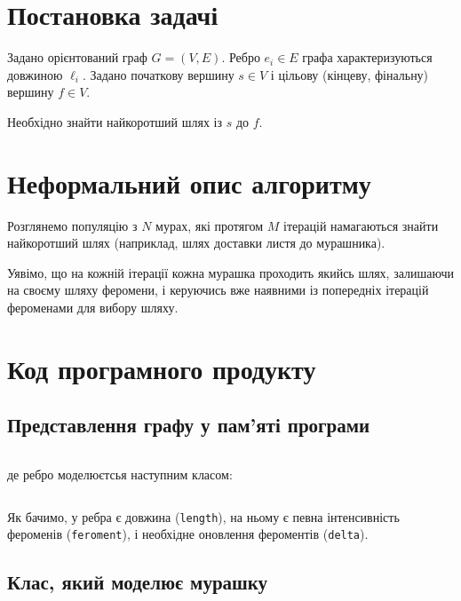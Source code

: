 \documentclass[a4paper, 12pt]{article}
\author{Скибицький Нікіта}
\date{\today}
\numberwithin{equation}{section}
\begin{document}

\people

\tableofcontents

\section{Постановка задачі}

Задано орієнтований граф $G = (V, E)$. Ребро $e_i \in E$ графа характеризуються довжиною $\ell_i$. Задано початкову вершину $s \in V$ і цільову (кінцеву, фінальну) вершину $f \in V$. \medskip

Необхідно знайти найкоротший шлях із $s$ до $f$.

\section{Неформальний опис алгоритму}

Розглянемо популяцію з $N$ мурах, які протягом $M$ ітерацій намагаються знайти найкоротший шлях (наприклад, шлях доставки листя до мурашника). \medskip

Уявімо, що на кожній ітерації кожна мурашка проходить якийсь шлях, залишаючи на своєму шляху феромени, і керуючись вже наявними із попередніх ітерацій фероменами для вибору шляху.

\section{Код програмного продукту}

\subsection{Представлення графу у пам'яті програми}

\inputminted[firstline=64, lastline=75]{python}{../../code/salesman/main.py}

де ребро моделюєтсья наступним класом:

\inputminted[firstline=55, lastline=60]{python}{../../code/salesman/main.py}

Як бачимо, у ребра є довжина (\verb|length|), на ньому є певна інтенсивність фероменів (\verb|feroment|), і необхідне оновлення фероментів (\verb|delta|).

\subsection{Клас, який моделює мурашку}
\end{document}
